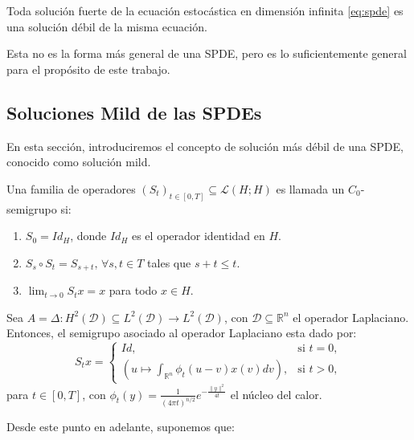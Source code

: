 \begin{prop}[]
  Toda solución fuerte de la ecuación estocástica en dimensión infinita \eqref{eq:spde} es una solución débil de la misma ecuación.
\end{prop}

\begin{obs}[]
  Esta no es la forma más general de una SPDE, pero es lo suficientemente general para el propósito de este trabajo.
\end{obs}

\subsection{Soluciones Mild de las SPDEs}

En esta sección, introduciremos el concepto de solución más débil de una SPDE, conocido como solución mild.

\begin{defn}[$C_0$-Semigrupo]
  Una familia de operadores $(S_t)_{t \in [0,T]} \subseteq \mathcal{L}(H;H)$ es llamada un $C_0$-semigrupo si:
  \begin{enumerate}
    \item $S_0 = Id_H$, donde $Id_H$ es el operador identidad en $H$.
    \item $S_s \circ S_t = S_{s + t},\, \forall s, t \in T$ tales que $s + t \leq t$.
    \item $\lim_{t \to 0} S_t x = x$ para todo $x \in H$.
  \end{enumerate}
\end{defn}

\begin{ej}
  Sea $A = \Delta: H^2(\mathcal{D}) \subseteq L^2(\mathcal{D}) \rightarrow L^2(\mathcal{D})$, con $\mathcal{D} \subseteq \mathbb{R}^{n}$ el operador Laplaciano. Entonces, el semigrupo asociado al operador Laplaciano esta dado por:
  \[
    S_t x =
    \begin{cases}
      Id, & \text{si } t = 0,\\
      (u \mapsto \int_{\mathbb{R}^{n}} \phi_t(u - v)x(v) dv), & \text{si } t > 0,
    \end{cases}
  \]
  para $t \in [0, T]$, con $\phi_t(y) = \frac{1}{(4\pi t)^{n/2}} e^{-\frac{\|y\|^2}{4t}}$ el núcleo del calor.
\end{ej}

Desde este punto en adelante, suponemos que:


